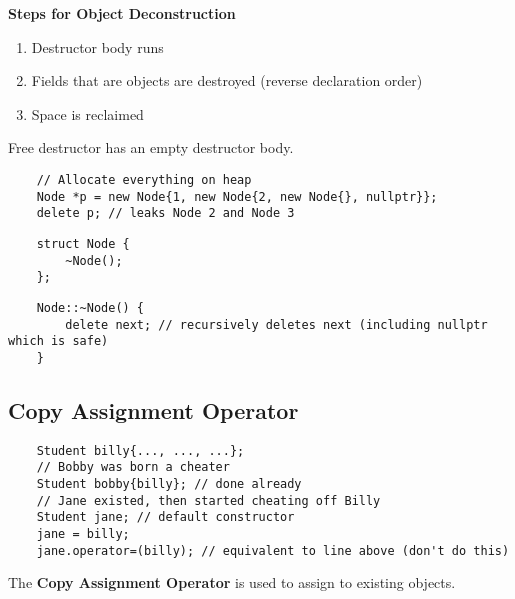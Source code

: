 \textbf{Steps for Object Deconstruction}
\begin{enumerate}[label=(\arabic*)]
    \item Destructor body runs
    \item Fields that are objects are destroyed (reverse declaration order)
    \item Space is reclaimed
\end{enumerate}
Free destructor has an empty destructor body.
\begin{lstlisting}
    // Allocate everything on heap
    Node *p = new Node{1, new Node{2, new Node{}, nullptr}};
    delete p; // leaks Node 2 and Node 3
\end{lstlisting}

\begin{lstlisting}
    struct Node {
        ~Node();
    };
\end{lstlisting}
\begin{lstlisting}
    Node::~Node() {
        delete next; // recursively deletes next (including nullptr which is safe)
    }
\end{lstlisting}

\subsection{Copy Assignment Operator}
\begin{lstlisting}
    Student billy{..., ..., ...};
    // Bobby was born a cheater
    Student bobby{billy}; // done already
    // Jane existed, then started cheating off Billy
    Student jane; // default constructor
    jane = billy;
    jane.operator=(billy); // equivalent to line above (don't do this)
\end{lstlisting}
The \textbf{Copy Assignment Operator} is used to assign to existing objects.
